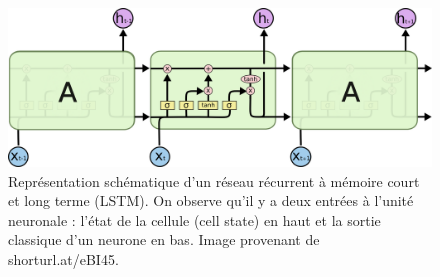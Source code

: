 \begin{figure}[h]
  \centering
  \includegraphics[width=14cm]{./Chapitre3/figures/lstm.png}
  \caption{Représentation schématique d'un réseau récurrent à mémoire court et long terme (LSTM). On observe qu'il y a deux entrées à l'unité neuronale : l'état de la cellule (cell state) en haut et la sortie classique d'un neurone en bas. Image provenant de shorturl.at/eBI45.}
  \label{fig:lstm}
\end{figure}
